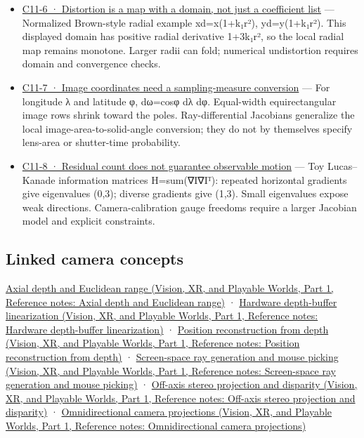 \begin{itemize}
\item
  \hyperref[02-foundations-ii-ch035-figure-c11-6-distortion-is-a-map-with-a-domain-not-just-a-coefficient-list]{C11-6 · Distortion is a map with a domain, not just a coefficient list} --- Normalized Brown-style radial example xd=x(1+k₁r²), yd=y(1+k₁r²). This displayed domain has positive radial derivative 1+3k₁r², so the local radial map remains monotone. Larger radii can fold; numerical undistortion requires domain and convergence checks.
\item
  \hyperref[02-foundations-ii-ch035-figure-c11-7-image-coordinates-need-a-sampling-measure-conversion]{C11-7 · Image coordinates need a sampling-measure conversion} --- For longitude λ and latitude φ, dω=cosφ dλ dφ. Equal-width equirectangular image rows shrink toward the poles. Ray-differential Jacobians generalize the local image-area-to-solid-angle conversion; they do not by themselves specify lens-area or shutter-time probability.
\item
  \hyperref[02-foundations-ii-ch035-figure-c11-8-residual-count-does-not-guarantee-observable-motion]{C11-8 · Residual count does not guarantee observable motion} --- Toy Lucas--Kanade information matrices H=sum(∇I∇Iᵀ): repeated horizontal gradients give eigenvalues (0,3); diverse gradients give (1,3). Small eigenvalues expose weak directions. Camera-calibration gauge freedoms require a larger Jacobian model and explicit constraints.
\end{itemize}

\subsection{Linked camera concepts}\label{appendix-a2b71a18f5a2-linked-camera-concepts}

\hypertarget{appendix-a2b71a18f5a2-linked-camera-concepts}{}

\href{../07-Vision-XR-and-Playable-Worlds-P01/main.pdf\#appendix-cac01ebeeb11}{Axial depth and Euclidean range (Vision, XR, and Playable Worlds, Part 1, Reference notes: Axial depth and Euclidean range)} · \href{../07-Vision-XR-and-Playable-Worlds-P01/main.pdf\#appendix-1bc40b08db4a}{Hardware depth-buffer linearization (Vision, XR, and Playable Worlds, Part 1, Reference notes: Hardware depth-buffer linearization)} · \href{../07-Vision-XR-and-Playable-Worlds-P01/main.pdf\#appendix-2cbf2968e866}{Position reconstruction from depth (Vision, XR, and Playable Worlds, Part 1, Reference notes: Position reconstruction from depth)} · \href{../07-Vision-XR-and-Playable-Worlds-P01/main.pdf\#appendix-f1a6d43e80d1}{Screen-space ray generation and mouse picking (Vision, XR, and Playable Worlds, Part 1, Reference notes: Screen-space ray generation and mouse picking)} · \href{../07-Vision-XR-and-Playable-Worlds-P01/main.pdf\#appendix-0976e86e5b9f}{Off-axis stereo projection and disparity (Vision, XR, and Playable Worlds, Part 1, Reference notes: Off-axis stereo projection and disparity)} · \href{../07-Vision-XR-and-Playable-Worlds-P01/main.pdf\#appendix-fc99ad39f351}{Omnidirectional camera projections (Vision, XR, and Playable Worlds, Part 1, Reference notes: Omnidirectional camera projections)}

